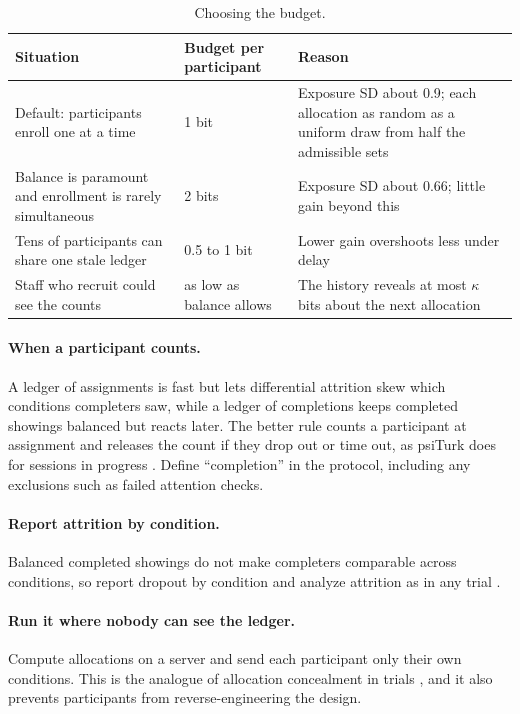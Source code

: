 \documentclass[11pt]{article}
\begin{document}
\begin{table}[ht]
\centering\small
\caption{Choosing the budget.}\label{tab:recs}
\begin{tabularx}{\textwidth}{@{}XlX@{}}
\toprule
Situation & Budget per participant & Reason \\
\midrule
Default: participants enroll one at a time & 1 bit & Exposure SD about 0.9; each allocation as random as a uniform draw from half the admissible sets \\
Balance is paramount and enrollment is rarely simultaneous & 2 bits & Exposure SD about 0.66; little gain beyond this \\
Tens of participants can share one stale ledger & 0.5 to 1 bit & Lower gain overshoots less under delay \\
Staff who recruit could see the counts & as low as balance allows & The history reveals at most $\kappa$ bits about the next allocation \\
\bottomrule
\end{tabularx}
\end{table}

\paragraph{When a participant counts.} A ledger of assignments is fast but lets differential attrition skew which conditions completers saw, while a ledger of completions keeps completed showings balanced but reacts later. The better rule counts a participant at assignment and releases the count if they drop out or time out, as psiTurk does for sessions in progress \citep{gureckis2016}. Define ``completion'' in the protocol, including any exclusions such as failed attention checks.

\paragraph{Report attrition by condition.} Balanced completed showings do not make completers comparable across conditions, so report dropout by condition and analyze attrition as in any trial \citep{bell2013}.

\paragraph{Run it where nobody can see the ledger.} Compute allocations on a server and send each participant only their own conditions. This is the analogue of allocation concealment in trials \citep{schulz2002}, and it also prevents participants from reverse-engineering the design.
\end{document}
